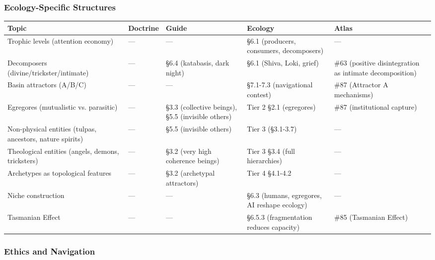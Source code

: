 \subsubsection*{Ecology-Specific Structures}



{\small
\begin{longtable}{>{\raggedright\arraybackslash}p{} >{\raggedright\arraybackslash}p{} >{\raggedright\arraybackslash}p{} >{\raggedright\arraybackslash}p{} >{\raggedright\arraybackslash}p{}}
\toprule
\textbf{Topic} & \textbf{Doctrine} & \textbf{Guide} & \textbf{Ecology} & \textbf{Atlas} \\
\midrule
\endhead
Trophic levels (attention economy) & — & — & §6.1 (producers, consumers, decomposers) & — \\
Decomposers (divine/\allowbreak trickster/\allowbreak intimate) & — & §6.4 (katabasis, dark night) & §6.1 (Shiva, Loki, grief) & \#63 (positive disintegration as intimate decomposition) \\
Basin attractors (A/\allowbreak B/\allowbreak C) & — & — & §7.1-7.3 (navigational contest) & \#87 (Attractor A mechanisms) \\
Egregores (mutualistic vs. parasitic) & — & §3.3 (collective beings), §5.5 (invisible others) & Tier 2 §2.1 (egregores) & \#87 (institutional capture) \\
Non-physical entities (tulpas, ancestors, nature spirits) & — & §5.5 (invisible others) & Tier 3 (§3.1-3.7) & — \\
Theological entities (angels, demons, tricksters) & — & §3.2 (very high coherence beings) & Tier 3 §3.4 (full hierarchies) & — \\
Archetypes as topological features & — & §3.2 (archetypal attractors) & Tier 4 §4.1-4.2 & — \\
Niche construction & — & — & §6.3 (humans, egregores, AI reshape ecology) & — \\
Tasmanian Effect & — & — & §6.5.3 (fragmentation reduces capacity) & \#85 (Tasmanian Effect) \\
\bottomrule
\end{longtable}
}



\subsubsection*{Ethics and Navigation}



